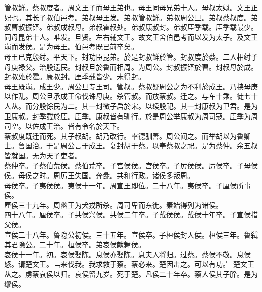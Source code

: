 \documentclass{zhvt-classic}
\begin{document}

\hspace*{2em}管叔鲜。蔡叔度者。周文王子而母王弟也。母王同母兄弟十人。母叔太姒。文王正妃也。其长子叔伯邑考。弟叔母王发。弟叔管叔鲜。弟叔周公旦。弟叔蔡叔度。弟叔曹叔振铎。弟叔成叔母。弟叔霍叔处。弟叔康叔封。弟叔厓季载。厓季载最少。同母昆弟十人。唯发。旦贤。左右辅文王。故文王舍伯邑考而以发为太子。及文王崩而发侯。是为母王。伯邑考既已前卒矣。\\
\hspace*{2em}母王已克殷纣。平天下。封功臣昆弟。於是封叔鲜於管。封叔度於蔡。二人相纣子母庚禄父。治殷遗民。封叔旦於鲁而相周。为周公。封叔振铎於曹。封叔母於成。封叔处於霍。康叔封。厓季载皆少。未得封。\\
\hspace*{2em}母王既崩。成王少。周公旦专王司。管叔。蔡叔疑周公之为不利於成王。乃挟母庚以作乱。周公旦承成王命伐诛母庚。杀管叔。而放蔡叔。迁之。与车十乘。徒七十人从。而分殷馀民为二。其一封微子启於宋。以续殷祀。其一封康叔为卫君。是为卫康叔。封季载於厓。厓季。康叔皆有驯行。於是周公举康叔为周司寇。厓季为周司空。以佐成王治。皆有令名於天下。\\
\hspace*{2em}蔡叔度既迁而死。其子叔胡。胡乃改行。率德驯善。周公闻之。而举胡以为鲁卿士。鲁国治。于是周公言于成王。复封胡于蔡。以奉蔡叔之祀。是为蔡仲。余五叔皆就国。无为天子吏者。\\
\hspace*{2em}蔡仲卒。子蔡伯荒侯。蔡伯荒卒。子宫侯侯。宫侯卒。子厉侯侯。厉侯卒。子母侯侯。母侯之时。周厉王失国。奔彘。共和行政。诸侯多叛周。\\
\hspace*{2em}母侯卒。子夷侯侯。夷侯十一年。周宣王即位。二十八年。夷侯卒。子厘侯所事侯。\\
\hspace*{2em}厘侯三十九年。周幽王为犬戎所杀。周司卑而东徙。秦始得列为诸侯。\\
\hspace*{2em}四十八年。厘侯卒。子共侯兴侯。共侯二年卒。子戴侯侯。戴侯十年卒。子宣侯措父侯。\\
\hspace*{2em}宣侯二十八年。鲁隐公初侯。三十五年。宣侯卒。子桓侯封人侯。桓侯三年。鲁弑其君隐公。二十年。桓侯卒。弟哀侯献舞侯。\\
\hspace*{2em}哀侯十一年。初。哀侯娶陈。息侯亦娶陈。息夫人将归。过蔡。蔡侯不敬。息侯怒。请楚文王。﹁来伐我。我求救于蔡。蔡必来。楚因击之。可以有功。﹂楚文王从之。虏蔡哀侯以归。哀侯留九岁。死于楚。凡侯二十年卒。蔡人侯其子肸。是为缪侯。\\
\end{document}
